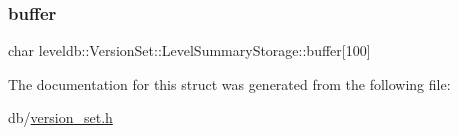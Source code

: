 \subsubsection{\texorpdfstring{buffer}{buffer}}
{\footnotesize\ttfamily char leveldb\+::\+Version\+Set\+::\+Level\+Summary\+Storage\+::buffer\mbox{[}100\mbox{]}}



The documentation for this struct was generated from the following file\+:\begin{DoxyCompactItemize}
\item 
db/\mbox{\hyperlink{version__set_8h}{version\+\_\+set.\+h}}\end{DoxyCompactItemize}
